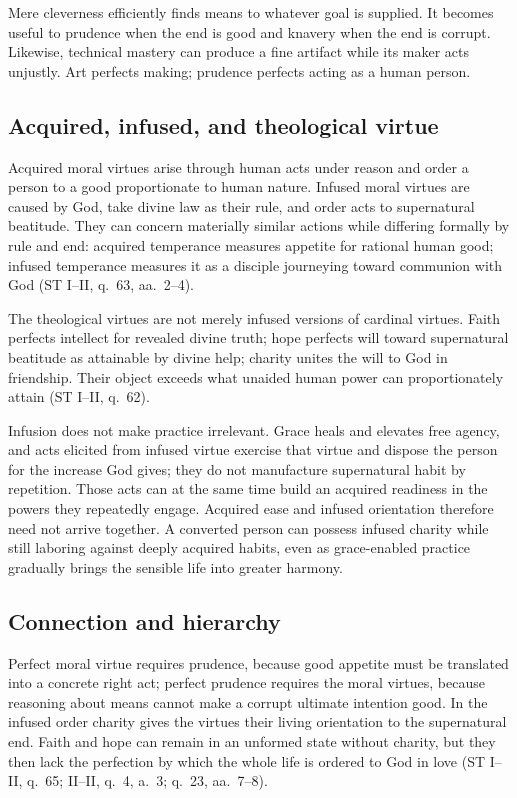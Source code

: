 Mere cleverness efficiently finds means to whatever goal is supplied. It becomes useful to prudence when the end is good and knavery when the end is corrupt. Likewise, technical mastery can produce a fine artifact while its maker acts unjustly. Art perfects making; prudence perfects acting as a human person.

\subsection{Acquired, infused, and theological virtue}

Acquired moral virtues arise through human acts under reason and order a person to a good proportionate to human nature. Infused moral virtues are caused by God, take divine law as their rule, and order acts to supernatural beatitude. They can concern materially similar actions while differing formally by rule and end: acquired temperance measures appetite for rational human good; infused temperance measures it as a disciple journeying toward communion with God (ST I--II, q.~63, aa.~2--4).

The theological virtues are not merely infused versions of cardinal virtues. Faith perfects intellect for revealed divine truth; hope perfects will toward supernatural beatitude as attainable by divine help; charity unites the will to God in friendship. Their object exceeds what unaided human power can proportionately attain (ST I--II, q.~62).

Infusion does not make practice irrelevant. Grace heals and elevates free agency, and acts elicited from infused virtue exercise that virtue and dispose the person for the increase God gives; they do not manufacture supernatural habit by repetition. Those acts can at the same time build an acquired readiness in the powers they repeatedly engage. Acquired ease and infused orientation therefore need not arrive together. A converted person can possess infused charity while still laboring against deeply acquired habits, even as grace-enabled practice gradually brings the sensible life into greater harmony.

\subsection{Connection and hierarchy}

Perfect moral virtue requires prudence, because good appetite must be translated into a concrete right act; perfect prudence requires the moral virtues, because reasoning about means cannot make a corrupt ultimate intention good. In the infused order charity gives the virtues their living orientation to the supernatural end. Faith and hope can remain in an unformed state without charity, but they then lack the perfection by which the whole life is ordered to God in love (ST I--II, q.~65; II--II, q.~4, a.~3; q.~23, aa.~7--8).

